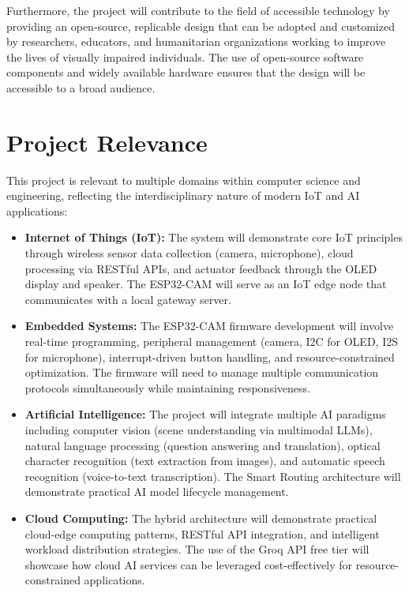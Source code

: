 Furthermore, the project will contribute to the field of accessible technology by providing an open-source, replicable design that can be adopted and customized by researchers, educators, and humanitarian organizations working to improve the lives of visually impaired individuals. The use of open-source software components and widely available hardware ensures that the design will be accessible to a broad audience.

\section{Project Relevance}
This project is relevant to multiple domains within computer science and engineering, reflecting the interdisciplinary nature of modern IoT and AI applications:

\begin{itemize}[leftmargin=1.5cm]
\item \textbf{Internet of Things (IoT):} The system will demonstrate core IoT principles through wireless sensor data collection (camera, microphone), cloud processing via RESTful APIs, and actuator feedback through the OLED display and speaker. The ESP32-CAM will serve as an IoT edge node that communicates with a local gateway server.

\item \textbf{Embedded Systems:} The ESP32-CAM firmware development will involve real-time programming, peripheral management (camera, I2C for OLED, I2S for microphone), interrupt-driven button handling, and resource-constrained optimization. The firmware will need to manage multiple communication protocols simultaneously while maintaining responsiveness.

\item \textbf{Artificial Intelligence:} The project will integrate multiple AI paradigms including computer vision (scene understanding via multimodal LLMs), natural language processing (question answering and translation), optical character recognition (text extraction from images), and automatic speech recognition (voice-to-text transcription). The Smart Routing architecture will demonstrate practical AI model lifecycle management.

\item \textbf{Cloud Computing:} The hybrid architecture will demonstrate practical cloud-edge computing patterns, RESTful API integration, and intelligent workload distribution strategies. The use of the Groq API free tier will showcase how cloud AI services can be leveraged cost-effectively for resource-constrained applications.


\end{itemize}
